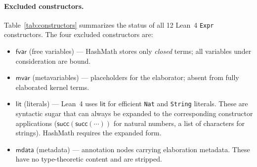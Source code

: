 \documentclass[11pt]{article}
\theoremstyle{definition}
\theoremstyle{plain}
\theoremstyle{remark}
\newcommand{\fvar}{\textsf{fvar}}
\newcommand{\mvar}{\textsf{mvar}}
\newcommand{\lit}{\textsf{lit}}
\newcommand{\mdata}{\textsf{mdata}}
\begin{document}
\paragraph{Excluded constructors.}
Table~\ref{tab:constructors} summarizes the status of all 12 Lean~4 \texttt{Expr}
constructors.
The four excluded constructors are:
\begin{itemize}[nosep]
  \item $\fvar$ (free variables) --- HashMath stores only \emph{closed} terms; all variables under consideration are bound.
  \item $\mvar$ (metavariables) --- placeholders for the elaborator; absent from fully elaborated kernel terms.
  \item $\lit$ (literals) --- Lean~4 uses $\lit$ for efficient \texttt{Nat} and \texttt{String} literals. These are syntactic sugar that can always be expanded to the corresponding constructor applications ($\textsf{succ}(\textsf{succ}(\cdots))$ for natural numbers, a list of characters for strings).
        HashMath requires the expanded form.
  \item $\mdata$ (metadata) --- annotation nodes carrying elaboration metadata. These have no type-theoretic content and are stripped.
\end{itemize}
\end{document}
